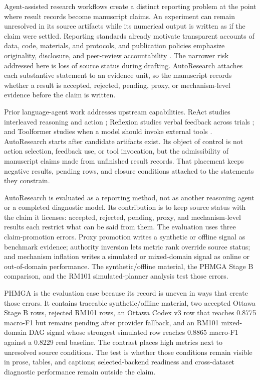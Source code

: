 Agent-assisted research workflows create a distinct reporting problem at the point where result records become manuscript claims. An experiment can remain unresolved in its source artifacts while its numerical output is written as if the claim were settled. Reporting standards already motivate transparent accounts of data, code, materials, and protocols, and publication policies emphasize originality, disclosure, and peer-review accountability \cite{nature-reporting,ieee-policies}. The narrower risk addressed here is loss of source status during drafting. AutoResearch attaches each substantive statement to an evidence unit, so the manuscript records whether a result is accepted, rejected, pending, proxy, or mechanism-level evidence before the claim is written.

Prior language-agent work addresses upstream capabilities. ReAct studies interleaved reasoning and action \cite{react}; Reflexion studies verbal feedback across trials \cite{reflexion}; and Toolformer studies when a model should invoke external tools \cite{toolformer}. AutoResearch starts after candidate artifacts exist. Its object of control is not action selection, feedback use, or tool invocation, but the admissibility of manuscript claims made from unfinished result records. That placement keeps negative results, pending rows, and closure conditions attached to the statements they constrain.

AutoResearch is evaluated as a reporting method, not as another reasoning agent or a completed diagnostic model. Its contribution is to keep source status with the claim it licenses: accepted, rejected, pending, proxy, and mechanism-level results each restrict what can be said from them. The evaluation uses three claim-promotion errors. Proxy promotion writes a synthetic or offline signal as benchmark evidence; authority inversion lets metric rank override source status; and mechanism inflation writes a simulated or mixed-domain signal as online or out-of-domain performance. The synthetic/offline material, the PHMGA Stage B comparison, and the RM101 simulated-planner analysis test those errors.

PHMGA is the evaluation case because its record is uneven in ways that create those errors. It contains traceable synthetic/offline material, two accepted Ottawa Stage B rows, rejected RM101 rows, an Ottawa Codex v3 row that reaches 0.8775 macro-F1 but remains pending after provider fallback, and an RM101 mixed-domain DAG signal whose strongest simulated row reaches 0.8865 macro-F1 against a 0.8229 real baseline. The contrast places high metrics next to unresolved source conditions. The test is whether those conditions remain visible in prose, tables, and captions; selected-backend readiness and cross-dataset diagnostic performance remain outside the claim.
